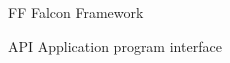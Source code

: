 \begin{siglas}
  \item[FF] Falcon Framework
  \item[API] Application program interface
\end{siglas}
